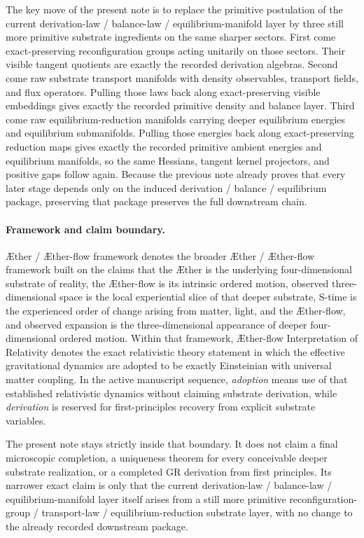 \documentclass[11pt]{article}
\newcommand{\Aether}{\AE{}ther}
\newcommand{\Aflow}{\AE{}ther-flow}
\newcommand{\TheoryName}{\Aflow{} Interpretation of Relativity}
\newcommand{\TheoryProgram}{\Aether{} / \Aflow{} framework}
\begin{document}
The key move of the present note is to replace the primitive postulation of the current derivation-law / balance-law / equilibrium-manifold layer by three still more primitive substrate ingredients on the same sharper sectors. First come exact-preserving reconfiguration groups acting unitarily on those sectors. Their visible tangent quotients are exactly the recorded derivation algebras. Second come raw substrate transport manifolds with density observables, transport fields, and flux operators. Pulling those laws back along exact-preserving visible embeddings gives exactly the recorded primitive density and balance layer. Third come raw equilibrium-reduction manifolds carrying deeper equilibrium energies and equilibrium submanifolds. Pulling those energies back along exact-preserving reduction maps gives exactly the recorded primitive ambient energies and equilibrium manifolds, so the same Hessians, tangent kernel projectors, and positive gaps follow again. Because the previous note already proves that every later stage depends only on the induced derivation / balance / equilibrium package, preserving that package preserves the full downstream chain.

\paragraph{Framework and claim boundary.}
\TheoryProgram{} denotes the broader \Aether{} / \Aflow{} framework built on the claims that the \Aether{} is the underlying four-dimensional substrate of reality, the \Aflow{} is its intrinsic ordered motion, observed three-dimensional space is the local experiential slice of that deeper substrate, S-time is the experienced order of change arising from matter, light, and the \Aflow{}, and observed expansion is the three-dimensional appearance of deeper four-dimensional ordered motion. Within that framework, \TheoryName{} denotes the exact relativistic theory statement in which the effective gravitational dynamics are adopted to be exactly Einsteinian with universal matter coupling. In the active manuscript sequence, \emph{adoption} means use of that established relativistic dynamics without claiming substrate derivation, while \emph{derivation} is reserved for first-principles recovery from explicit substrate variables.

The present note stays strictly inside that boundary. It does not claim a final microscopic completion, a uniqueness theorem for every conceivable deeper substrate realization, or a completed GR derivation from first principles. Its narrower exact claim is only that the current derivation-law / balance-law / equilibrium-manifold layer itself arises from a still more primitive reconfiguration-group / transport-law / equilibrium-reduction substrate layer, with no change to the already recorded downstream package.
\end{document}

